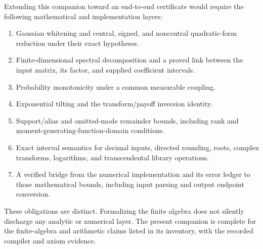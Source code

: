 \documentclass[11pt]{article}
\begin{document}
Extending this companion toward an end-to-end certificate would require the
following mathematical and implementation layers:
\begin{enumerate}
 \item Gaussian whitening and central, signed, and noncentral quadratic-form
 reduction under their exact hypotheses.
 \item Finite-dimensional spectral decomposition and a proved link between
 the input matrix, its factor, and supplied coefficient intervals.
 \item Probability monotonicity under a common measurable coupling.
 \item Exponential tilting and the transform/payoff inversion identity.
 \item Support/alias and omitted-mode remainder bounds, including rank and
 moment-generating-function-domain conditions.
 \item Exact interval semantics for decimal inputs, directed rounding, roots,
 complex transforms, logarithms, and transcendental library operations.
 \item A verified bridge from the numerical implementation and its error
 ledger to those mathematical bounds, including input parsing and output
 endpoint conversion.
\end{enumerate}
These obligations are distinct. Formalizing the finite algebra does not
silently discharge any analytic or numerical layer. The present companion
is complete for the finite-algebra and arithmetic claims listed in its
inventory, with the recorded compiler and axiom evidence.
\end{document}
